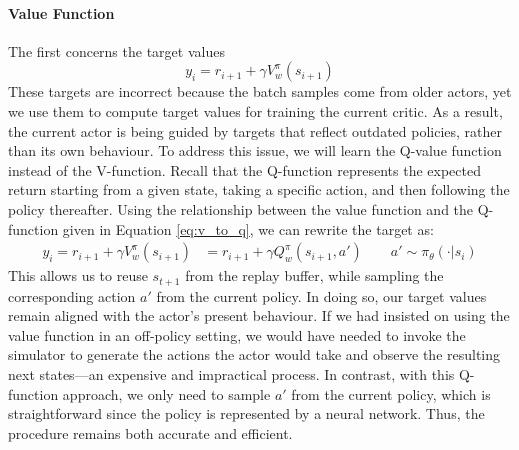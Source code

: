 \paragraph{Value Function} The first concerns the target values
$$y_i = r_{i+1} + \gamma V^\pi_{w}(s_{i+1})$$
These targets are incorrect because the batch samples come from older actors, yet we use them to compute target values for 
training the current critic. As a result, the current actor is being guided by targets that reflect outdated policies, rather 
than its own behaviour.\newline 
To address this issue, we will learn the Q-value function instead of the V-function.  Recall that the Q-function represents 
the expected return starting from a given state, taking a specific action, and then following the policy thereafter. Using the 
relationship between the value function and the Q-function given in Equation \eqref{eq:v_to_q}, we can rewrite the target as:
\begin{align*}
    y_i = r_{i+1} + \gamma V^\pi_{w}(s_{i+1}) 
    &=  r_{i+1} + \gamma Q^\pi_{w}(s_{i+1},a') \qquad a' \sim \pi_\theta(\cdot|s_i)
\end{align*}
This allows us to reuse  $s_{t+1}$ from the replay buffer, while sampling the corresponding action $a'$ from the current 
policy. In doing so, our target values remain aligned with the actor's present behaviour. If we had insisted on using the 
value function in an off-policy setting, we would have needed to invoke the simulator to generate the actions the actor would 
take and observe the resulting next states—an expensive and impractical process. In contrast, with this Q-function approach, 
we only need to sample $a'$ from the current policy, which is straightforward since the policy is represented by a neural 
network. Thus, the procedure remains both accurate and efficient.

